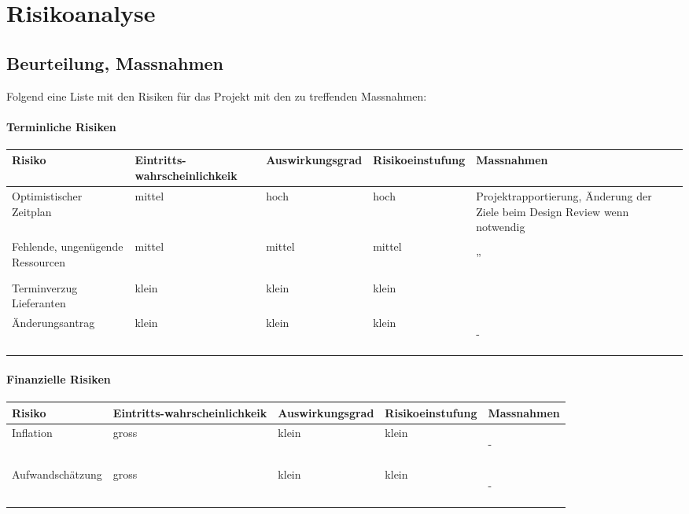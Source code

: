 \chapter{Risikoanalyse}
\section{Beurteilung, Massnahmen}
Folgend eine Liste mit den Risiken f\"ur das Projekt mit den zu treffenden Massnahmen:\newline

\begin{landscape}
\pagestyle{empty}
\subsubsection{Terminliche Risiken}
\begin{tabular}[ht]{|p{3cm}|p{3cm}|p{3cm}|p{3cm}|p{6cm}|}
  \hline
 Risiko & Eintritts-wahrscheinlichkeik & Auswirkungsgrad & Risikoeinstufung & Massnahmen\\
 \hline
 Optimistischer Zeitplan & mittel & hoch & hoch & Projektrapportierung, \"Anderung der Ziele beim Design Review wenn notwendig \\
 \hline
 Fehlende, ungen\"ugende Ressourcen & mittel & mittel & mittel & \begin{center}''\end{center} \\
 \hline
 Terminverzug Lieferanten & klein & klein & klein & \\
 \hline
 \"Anderungsantrag & klein & klein & klein & \begin{center}-\end{center} \\
 \hline
\end{tabular}

\subsubsection{Finanzielle Risiken}
\begin{tabular}[ht]{|p{3cm}|p{3cm}|p{3cm}|p{3cm}|p{6cm}|}
  \hline
 Risiko & Eintritts-wahrscheinlichkeik & Auswirkungsgrad & Risikoeinstufung & Massnahmen\\
 \hline
 Inflation & gross & klein & klein & \begin{center}-\end{center} \\ 
  \hline
 Aufwandsch\"atzung & gross & klein & klein & \begin{center}-\end{center} \\ 
 \hline
\end{tabular}


\end{landscape}
